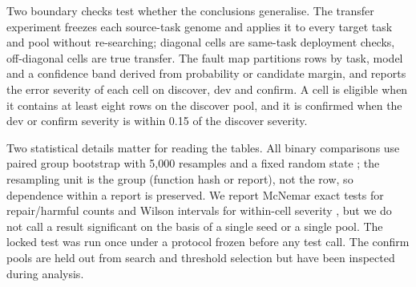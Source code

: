 Two boundary checks test whether the conclusions generalise. The transfer experiment freezes each source-task
genome and applies it to every target task and pool without re-searching;
diagonal cells are same-task deployment checks, off-diagonal cells are true
transfer. The fault map partitions rows by task, model and a confidence band
derived from \noul{} probability or candidate margin, and reports the error
severity of each cell on discover, dev and confirm. A cell is eligible when it
contains at least eight rows on the discover pool, and it is confirmed when the
dev or confirm severity is within 0.15 of the discover severity.

Two statistical details matter for reading the tables. All binary comparisons
use paired group bootstrap with 5{,}000 resamples and a fixed random state
\citep{efron1993bootstrap}; the resampling unit is the group (function hash or
report), not the row, so dependence within a report is preserved. We report
McNemar exact tests for repair/harmful counts \citep{mcnemar1947} and Wilson
intervals for within-cell severity \citep{wilson1927}, but we do not call a
result significant on the basis of a single seed or a single pool. The locked
test was run once under a protocol frozen before any test call. The confirm
pools are held out from search and threshold selection but have been inspected
during analysis.
